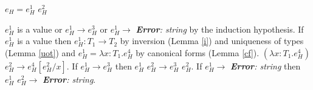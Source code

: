 \begin{case}
$e_{H}=e_{H}^{1}$ $e_{H}^{2}$

$e_{H}^{1}$ is a value or $e_{H}^{1}\rightarrow e_{H}^{3}$ or $e_{H}^{1}\rightarrow$ \emph{\textbf{Error}: string} by the induction hypothesis.  If $e_{H}^{1}$ is a value then $e_{H}^{1}:T_{1}\rightarrow T_{2}$ by inversion (Lemma \ref{i}) and uniqueness of types (Lemma \ref{uot}) and $e_{H}^{1}=\lambda x:T_{1}.e_{H}^{4}$ by canonical forms (Lemma \ref{cf}).  $(\lambda x:T_{1}.e_{H}^{4})$ $e_{H}^{2}\rightarrow e_{H}^{4}[e_{H}^{2}/x]$.  If $e_{H}^{1}\rightarrow e_{H}^{3}$ then $e_{H}^{1}$ $e_{H}^{2}\rightarrow e_{H}^{3}$ $e_{H}^{2}$.  If $e_{H}^{1}\rightarrow$ \emph{\textbf{Error}: string} then $e_{H}^{1}$ $e_{H}^{2}\rightarrow$ \emph{\textbf{Error}: string}.
\end{case}